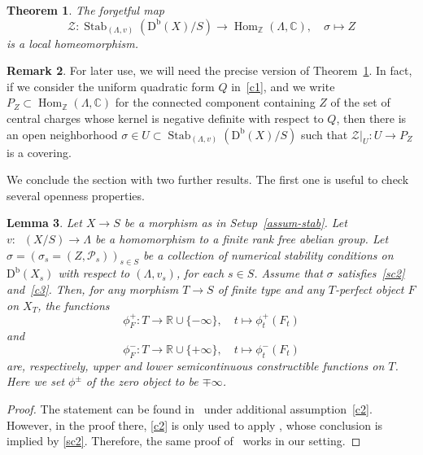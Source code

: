 \documentclass[11pt, reqno]{amsart}
\numberwithin{equation}{section}
\theoremstyle{plain}
\newtheorem{theorem}{Theorem}[section]
\newtheorem{lemma}[theorem]{Lemma}
\theoremstyle{remark}
\theoremstyle{definition}
\newtheorem{remark}[theorem]{Remark}
\theoremstyle{italicsname}
\newcommand{\Db}{\mathrm{D^b}}
\newcommand{\num}{\mathrm{num}}
\DeclareMathOperator{\Knum}{\rK_{\num}}
\DeclareMathOperator{\Stab}{Stab}
\DeclareMathOperator{\Hom}{Hom}
\newcommand{\cZ}{\mathcal{Z}}
\newcommand{\cP}{\mathscr{P}}
\newcommand{\rK}{\mathrm{K}}
\def\CC{\ensuremath{\mathbb{C}}}
\def\RR{\ensuremath{\mathbb{R}}}
\def\ZZ{\ensuremath{\mathbb{Z}}}
\begin{document}
\begin{theorem}\label{thm:BridgelandDeformationFamilyVersion}
The forgetful map
\[
\cZ\colon\Stab_{(\Lambda,v)}(\Db(X)/S)\longrightarrow \Hom_{\ZZ}(\Lambda,\CC),\quad {\sigma}\longmapsto Z
\]
is a local homeomorphism.
\end{theorem}

\begin{remark}\label{rmk:BridgelandDeformationFamilyVersion}
For later use, we will need the precise version of Theorem~\ref{thm:BridgelandDeformationFamilyVersion}.
In fact, if we consider the uniform quadratic form $Q$ in~\ref{c1}, and we write $P_Z\subset\Hom_{\ZZ}(\Lambda,\CC)$ for the connected component containing $Z$ of the set of central charges whose kernel is negative definite with respect to $Q$, then there is an open neighborhood ${\sigma}\in U\subset\Stab_{(\Lambda,v)}(\Db(X)/S)$ such that $\cZ|_U\colon U\to P_Z$ is a covering.    
\end{remark}

We conclude the section with two further results.
The first one is useful to check several openness properties.

\begin{lemma}\label{lem:openness-flat}
Let $X\to S$ be a morphism as in Setup~\ref{assum-stab}. 
Let $v\colon\Knum(X/S)\to\Lambda$ be a homomorphism to a finite rank free abelian group. 
Let ${\sigma}=(\sigma_s=(Z,\cP_s))_{s\in S}$ be a collection of numerical stability conditions on $\Db(X_s)$ with respect to $(\Lambda,v_s)$, for each $s\in S$. 
Assume that ${\sigma}$ satisfies~\ref{sc2} and~\ref{c3}.
Then, for any morphism $T\to S$ of finite type and any $T$-perfect object $F$ on $X_T$, the functions
\[
\phi^+_F\colon T\to \RR\cup\{-\infty\},\quad t\mapsto \phi^+_{t}(F_t)
\]
and
\[
\phi^-_F\colon T\to \RR\cup\{+\infty\},\quad t\mapsto \phi^-_{t}(F_t)
\]
are, respectively, upper and lower semicontinuous constructible functions on $T$. 
Here we set $\phi^{\pm}$ of the zero object to be $\mp\infty$.
\end{lemma}

\begin{proof}
The statement can be found in~\cite[Lemma 20.9]{stability-families} under additional assumption~\ref{c2}.
However, in the proof there, \ref{c2} is only used to apply \cite[Lemma 20.4]{stability-families}, whose conclusion is implied by \ref{sc2}. 
Therefore, the same proof of~\cite[Lemma 20.9]{stability-families} works in our setting.
\end{proof}
\end{document}
